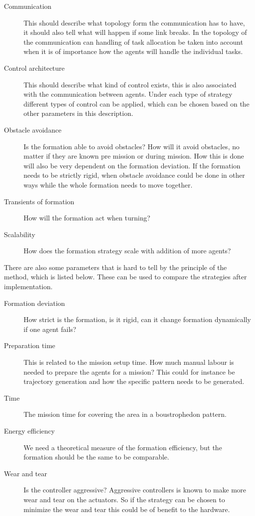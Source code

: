 \begin{description}
\item[Communication] This should describe what topology form the
	communication has to have, it should also tell what will happen if
	some link breaks. In the topology of the communication can handling
	of task allocation be taken into account when it is of importance
	how the agents will handle the individual tasks.
\item[Control architecture] This should describe what kind of control
	exists, this is also associated with the communication between
	agents. Under each type of strategy different types of control can
	be applied, which can be chosen based on the other parameters in
	this description.
\item[Obstacle avoidance] Is the formation able to avoid obstacles?
	How will it avoid obstacles, no matter if they are known pre mission
	or during mission. How this is done will also be very dependent on
	the formation deviation. If the formation needs to be strictly
	rigid, when obstacle avoidance could be done in other ways while the
	whole formation needs to move together.
\item[Transients of formation] How will the formation act when
	turning?
\item[Scalability] How does the formation strategy scale with addition
	of more agents?
\end{description}
There are also some parameters that is hard to tell by the principle
of the method, which is listed below. These can be used to compare the
strategies after implementation.
\begin{description}
\item[Formation deviation] How strict is the formation, is it rigid,
	can it change formation dynamically if one agent fails?
\item[Preparation time] This is related to the mission setup time. How
	much manual labour is needed to prepare the agents for a mission?
	This could for instance be trajectory generation and how the
	specific pattern needs to be generated.
\item[Time] The mission time for covering the area in a boustrophedon
	pattern.
\item[Energy efficiency] We need a theoretical measure of the
	formation efficiency, but the formation should be the same to be
	comparable.
\item[Wear and tear] Is the controller aggressive? Aggressive
	controllers is known to make more wear and tear on the actuators. So
	if the strategy can be chosen to minimize the wear and tear this
	could be of benefit to the hardware.
\end{description}

